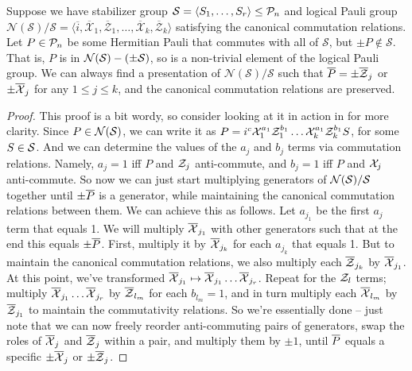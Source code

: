 \begin{lemma}\label{lem:logical_presentation_WLOG_case_3}
    Suppose we have stabilizer group $\mathcal{S} = \langle S_1, \ldots, S_r \rangle \leq \mathcal{P}_n$ and logical Pauli group $\mathcal{N}(\mathcal{S})/\mathcal{S} = \langle \overline{i}, \overline{\mathcal{X}}_1, \overline{\mathcal{Z}}_1, \ldots, \overline{\mathcal{X}}_k, \overline{\mathcal{Z}}_k \rangle$ satisfying the canonical commutation relations.
    Let $P \in \mathcal{P}_n$ be some Hermitian Pauli that commutes with all of $\mathcal{S}$, but $\pm P \notin \mathcal{S}$.
    That is, $P$ is in $\mathcal{N}(\mathcal{S}) - (\pm \mathcal{S})$, so is a non-trivial element of the logical Pauli group.
    We can always find a presentation of $\mathcal{N}(\mathcal{S})/\mathcal{S}$ such that $\overline{P} = \pm \overline{\mathcal{Z}}_j$ or $\pm \overline{\mathcal{X}}_j$ for any $1 \leq j \leq k$, and the canonical commutation relations are preserved.
    \begin{proof}
        This proof is a bit wordy, so consider looking at it in action in  for more clarity.
        Since $P \in \mathcal{N}(\mathcal{S})$, we can write it as $P = i^c \mathcal{X}_1^{a_1}\mathcal{Z}_1^{b_1} \ldots \mathcal{X}_k^{a_1}\mathcal{Z}_k^{b_1} S$, for some $S \in \mathcal{S}$.
        And we can determine the values of the $a_j$ and $b_j$ terms via commutation relations.
        Namely, $a_j = 1$ iff $P$ and $\mathcal{Z}_j$ anti-commute, and $b_j = 1$ iff $P$ and $\mathcal{X}_j$ anti-commute.
        So now we can just start multiplying generators of $\mathcal{N}(\mathcal{S})/\mathcal{S}$ together until $\pm \overline{P}$ is a generator, while maintaining the canonical commutation relations between them.
        We can achieve this as follows.
        Let $a_{j_1}$ be the first $a_j$ term that equals 1.
        We will multiply $\overline{\mathcal{X}}_{j_1}$ with other generators such that at the end this equals $\pm \overline{P}$.
        First, multiply it by $\overline{\mathcal{X}}_{j_k}$ for each ${a_{j_k}}$ that equals 1.
        But to maintain the canonical commutation relations, we also multiply each $\overline{\mathcal{Z}}_{j_k}$ by $\overline{\mathcal{X}}_{j_1}$.
        At this point, we've transformed $\overline{\mathcal{X}}_{j_1} \mapsto \overline{\mathcal{X}}_{j_1} \ldots \overline{\mathcal{X}}_{j_r}$.
        Repeat for the $\mathcal{Z}_l$ terms; multiply $\overline{\mathcal{X}}_{j_1} \ldots \overline{\mathcal{X}}_{j_r}$ by $\overline{\mathcal{Z}}_{l_m}$ for each $b_{l_m} = 1$, and in turn multiply each $\overline{\mathcal{X}}_{l_m}$ by $\overline{\mathcal{Z}}_{j_1}$ to maintain the commutativity relations.
        So we're essentially done -- just note that we can now freely reorder anti-commuting pairs of generators, swap the roles of $\overline{\mathcal{X}}_j$ and $\overline{\mathcal{Z}}_j$ within a pair, and multiply them by $\pm 1$, until $\overline{P}$ equals a specific $\pm \overline{\mathcal{X}}_j$ or $\pm \overline{\mathcal{Z}}_j$.
    \end{proof}
\end{lemma}

